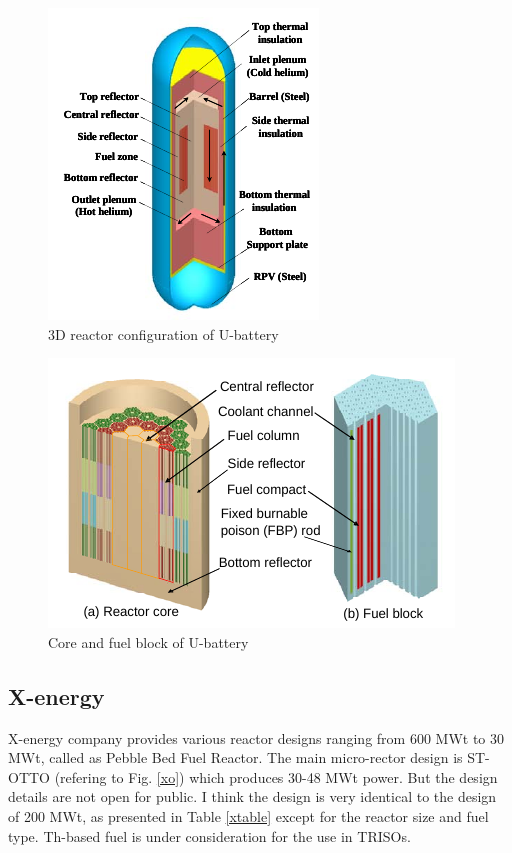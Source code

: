 \documentclass[10pt,a4paper]{article}
\begin{document}
\begin{figure}[htbp]
\centering
\includegraphics[scale=1]{Figs/ubattery3d.jpeg}
\caption{ 3D reactor configuration of U-battery}
\label{u3d}
\end{figure}

\begin{figure}[htbp]
\centering
\includegraphics[scale=1]{Figs/ubatterycore.jpeg}
\caption{ Core and fuel block of U-battery}
\label{ucore}
\end{figure}

\pagebreak
\subsection{X-energy}
X-energy company provides various reactor designs ranging from 600 MWt to 30 MWt, called as Pebble Bed Fuel Reactor. The main micro-rector design is ST-OTTO (refering to Fig.  \ref{xo}) which produces 30-48 MWt power. But the design details are not open for public. I think the design is very identical to the design of 200 MWt, as presented in Table \ref{xtable} except for the reactor size and fuel type. Th-based fuel is under consideration for the use in TRISOs. 
\end{document}
